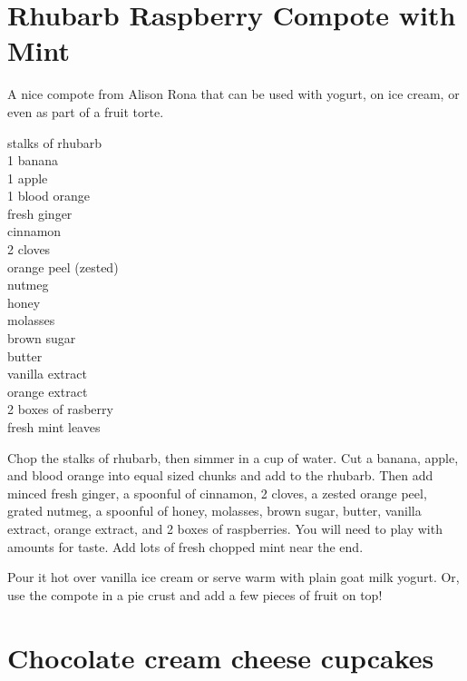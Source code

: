 \section{Rhubarb Raspberry Compote with Mint}

\begin{open}
    A nice compote from Alison Rona that can be used with yogurt, on ice cream, or even as part of a fruit torte.
\end{open}
\begin{ingredients}
    stalks of rhubarb\\
    1 banana\\
    1 apple\\
    1 blood orange\\
    fresh ginger\\
    cinnamon\\
    2 cloves\\
    orange peel (zested)\\
    nutmeg\\
    honey\\
    molasses\\
    brown sugar\\
    butter\\
    vanilla extract\\
    orange extract\\
    2 boxes of rasberry\\
    fresh mint leaves
\end{ingredients}
Chop the stalks of rhubarb, then simmer in a cup of water.  Cut a banana,
apple, and blood orange into equal sized chunks and add to the rhubarb.  Then
add minced fresh ginger, a spoonful of cinnamon, 2 cloves, a zested orange peel,
grated nutmeg, a spoonful of honey, molasses, brown sugar, butter, vanilla
extract, orange extract, and 2 boxes of raspberries.  You will need to play with
amounts for taste.  Add lots of fresh chopped mint near the end.

Pour it hot over vanilla ice cream or serve warm with plain goat milk yogurt.
Or, use the compote in a pie crust and add a few pieces of fruit on top!

\section{Chocolate cream cheese cupcakes}

